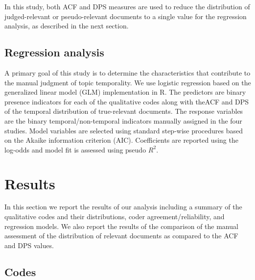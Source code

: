\documentclass[runningheads,a4paper]{llncs}
\begin{document}
In this study, both ACF and DPS measures are used to reduce the distribution of judged-relevant or pseudo-relevant documents to a single value for the regression analysis, as described in the next section.

\subsection{Regression analysis}

A primary goal of this study is to determine the characteristics that contribute to the manual judgment of topic temporality. We use logistic regression based on the generalized linear model (GLM) implementation in R. The predictors are binary presence indicators for each of the qualitative codes along with theACF and DPS of the temporal distribution of true-relevant documents.  The response variables are the binary temporal/non-temporal indicators manually assigned in the four studies.  Model variables are selected using standard step-wise procedures based on the Akaike information criterion (AIC). Coefficients are reported using the log-odds and model fit is assessed using pseudo $R^2$.

\section{Results}

In this section we report the results of our analysis including a summary of the qualitative codes and their distributions, coder agreement/reliability, and regression models. We also report the results of the comparison of the manual assessment of the distribution of relevant documents as compared to the ACF and DPS values.

\subsection{Codes}
\end{document}
